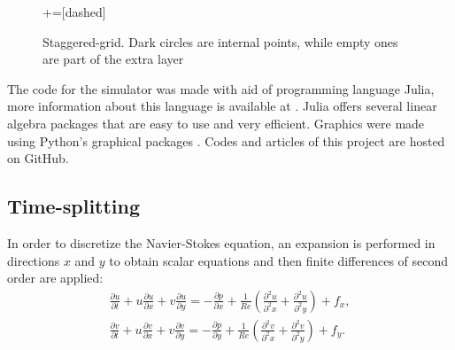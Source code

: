 \documentclass[journal]{IEEEtran}
\begin{document}
\begin{figure}[!ht]
\centering
{}+=[dashed]
\caption{Staggered-grid. Dark circles are internal points, while empty ones are part of the extra layer\label{staggered-grid}}
\end{figure}

The code for the simulator was made with aid of programming language Julia, more information about this language is available at \cite{JuliaProgramming}. Julia offers several linear algebra packages that are easy to use and very efficient. Graphics were made using Python's graphical packages \cite{matplotlib}. Codes and articles of this project are hosted on GitHub\cite{gitHubFerrofluidos}.


\subsection{Time-splitting}
In order to discretize the Navier-Stokes equation, an expansion is performed in directions $x$ and $y$ to obtain scalar equations and then finite differences of second order are applied: \begin{eqnarray}
\frac{\partial u}{\partial t}+u\frac{\partial u}{\partial x}+v\frac{\partial
u}{\partial y}=-\frac{\partial p}{\partial
x}+\frac{1}{\mathit{Re}}\left(\frac{\partial^2 u}{\partial^2 x}+\frac{\partial^2 u}{\partial^2
y}\right)+f_x, \label{navierX}\\
\frac{\partial v}{\partial t}+u\frac{\partial v}{\partial x}+v\frac{\partial
v}{\partial y}=-\frac{\partial p}{\partial
y}+\frac{1}{\mathit{Re}}\left(\frac{\partial^2 v}{\partial^2 x}+\frac{\partial^2 v}{\partial^2
y}\right)+f_y. \label{navierY}
\end{eqnarray}
\end{document}
